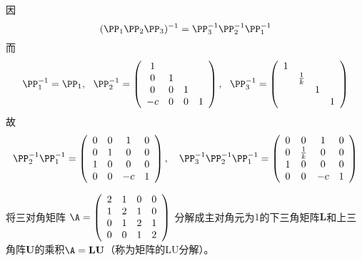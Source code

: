 \begin{frame}\ft{\secname}

\begin{jie}[续]
	因
	$$
	(\PP_1\PP_2\PP_3)^{-1} = \PP_3^{-1}\PP_2^{-1}\PP_1^{-1}
	$$
	\pause
	而
	$$
	\PP_1^{-1} = \PP_1, ~~
	\PP_2^{-1} = \left(
	\begin{array}{cccc}
	1& & &  \\
	0&1& &  \\
	0&0&1& \\
	-c&0&0&1
	\end{array}
	\right), ~~
	\PP_3^{-1} = \left(
	\begin{array}{cccc}
	1& & &  \\
	&\frac1k& &  \\
	& &1& \\
	& & &1
	\end{array}
	\right)
	$$    
	\pause
	故
	$$
	\PP_2^{-1}\PP_1^{-1} =   \left(
	  \begin{array}{cccc}
	    0&0&1&0 \\
	    0&1&0&0 \\
	    1&0&0&0 \\
	    0&0&-c&1
	  \end{array}
	\right), \quad  
	\PP_3^{-1}\PP_2^{-1}\PP_1^{-1} =  \left(
	  \begin{array}{cccc}
	    0&0&1&0 \\
	    0&\frac1k&0&0 \\
	    1&0&0&0 \\
	    0&0&-c&1
	  \end{array}
	\right)
	$$
\end{jie}

\end{frame}


\begin{frame}\ft{\secname}
\begin{li}
  将三对角矩阵
  $
  \A = \left(
    \begin{array}{cccc}
      2 & 1 & 0 & 0\\
      1 & 2 & 1 & 0\\
      0 & 1 & 2 & 1\\
      0 & 0 & 1 & 2
    \end{array}
  \right)
  $
  分解成主对角元为$1$的下三角矩阵$\mathbf{L}$和上三角阵$\mathbf{U}$的乘积$\A=\mathbf{L}\mathbf{U}$（称为矩阵的LU分解）。
\end{li}
\end{frame}


